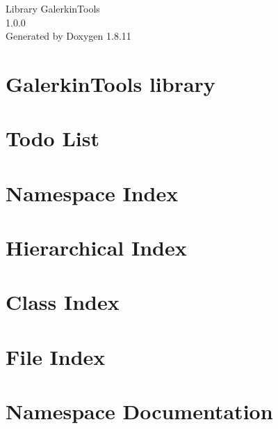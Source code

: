 \documentclass[twoside]{book}
\newcommand{\+}{\discretionary{\mbox{\scriptsize$\hookleftarrow$}}{}{}}
\newcommand{\clearemptydoublepage}{%
  \newpage{\pagestyle{empty}\cleardoublepage}%
}
\begin{document}
\hypersetup{pageanchor=false,
             bookmarksnumbered=true,
             pdfencoding=unicode
            }
\begin{titlepage}
\vspace*{7cm}
\begin{center}%
{\Large Library Galerkin\+Tools \\[1ex]\large 1.\+0.\+0 }\\
\vspace*{1cm}
{\large Generated by Doxygen 1.8.11}\\
\end{center}
\end{titlepage}
\clearemptydoublepage
\tableofcontents
\clearemptydoublepage
{}
\hypersetup{pageanchor=true}

\chapter{Galerkin\+Tools library}
\label{index}\hypertarget{index}{}
\chapter{Todo List}
\label{todo}
\hypertarget{todo}{}

\chapter{Namespace Index}

\chapter{Hierarchical Index}

\chapter{Class Index}

\chapter{File Index}

\chapter{Namespace Documentation}


\end{document}
